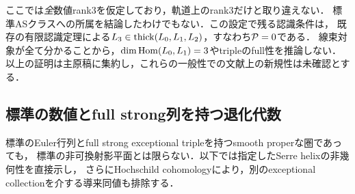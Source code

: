\documentclass[11pt,a4paper]{ltjsarticle}
\begin{document}
ここでは\emph{全}数値rank3を仮定しており，軌道上のrank3だけと取り違えない．
標準ASクラスへの所属を結論したわけでもない．この設定で残る認識条件は，
既存の有限認識定理による$L_3\in\operatorname{thick}(L_0,L_1,L_2)$，すなわち$\mathcal P=0$である．
線束対象が全て分かることから，$\dim\operatorname{Hom}(L_0,L_1)=3$やtripleのfull性を推論しない．
以上の証明は主原稿に集約し，これらの一般性での文献上の新規性は未確認とする．



\subsection{標準の数値とfull strong列を持つ退化代数}
\label{subsec:v9-degenerate-beilinson}
標準のEuler行列とfull strong exceptional tripleを持つsmooth properな圏であっても，
標準の非可換射影平面とは限らない．以下では指定したSerre helixの非幾何性を直接示し，
さらにHochschild cohomologyにより，別のexceptional collectionを介する導来同値も排除する．
\end{document}
